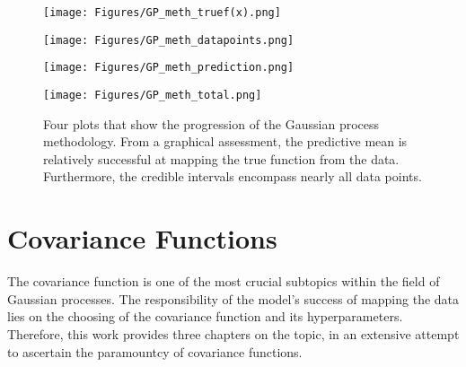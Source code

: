 \documentclass[12pt,a4paper]{article}
\begin{document}
\begin{figure}[ht]
    \centering

    \begin{minipage}{0.45\textwidth}
        \centering
        \texttt{[image: Figures/GP\_meth\_truef(x).png]} %
        \subcaption{}
        \label{fig:GP_meth_truef(x)}
    \end{minipage} 
    \begin{minipage}{0.45\textwidth}
        \centering
        \texttt{[image: Figures/GP\_meth\_datapoints.png]} %
        \subcaption{}
        \label{fig:GP_meth_datapoints}
    \end{minipage}

    \begin{minipage}{0.45\textwidth}
        \centering
        \texttt{[image: Figures/GP\_meth\_prediction.png]} %
        \subcaption{}
        \label{fig:GP_meth_prediction}
    \end{minipage} 
    \begin{minipage}{0.45\textwidth}
        \centering
        \texttt{[image: Figures/GP\_meth\_total.png]} %
        \subcaption{}
        \label{fig:GP_meth_total}
    \end{minipage}

    \caption{Four plots that show the progression of the Gaussian process methodology. From a graphical assessment, the predictive mean is relatively successful at mapping the true function from the data. Furthermore, the credible intervals encompass nearly all data points.}
    \label{fig:GP meth}
\end{figure}

\clearpage
\newpage
\section{Covariance Functions}
\label{sec:kernels}

The covariance function is one of the most crucial subtopics within the field of Gaussian processes. The responsibility of the model's success of mapping the data lies on the choosing of the covariance function and its hyperparameters. Therefore, this work provides three chapters on the topic, in an extensive attempt to ascertain the paramountcy of covariance functions. 
\end{document}
